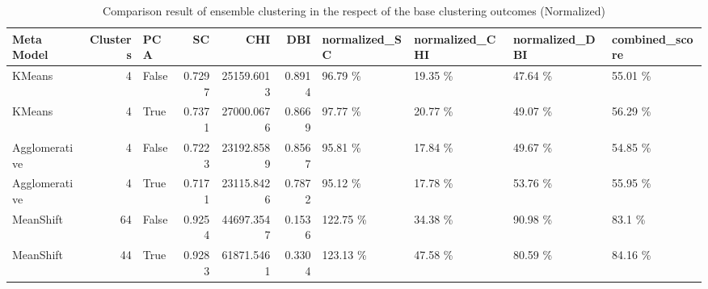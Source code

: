 \begin{table}[t]
\centering
\caption{Comparison result of ensemble clustering in the respect of the base clustering outcomes (Normalized)}
\label{tbl:meta_clustering_score_results_normalized}
\begin{tabular}{lrlrrrllll}
\toprule
   Meta Model &  Clusters &   PCA &     SC &        CHI &    DBI & normalized_SC & normalized_CHI & normalized_DBI & combined_score \\
\midrule
       KMeans &         4 & False & 0.7297 & 25159.6013 & 0.8914 &      96.79 \% &       19.35 \% &       47.64 \% &       55.01 \% \\
       KMeans &         4 &  True & 0.7371 & 27000.0676 & 0.8669 &      97.77 \% &       20.77 \% &       49.07 \% &       56.29 \% \\
Agglomerative &         4 & False & 0.7223 & 23192.8589 & 0.8567 &      95.81 \% &       17.84 \% &       49.67 \% &       54.85 \% \\
Agglomerative &         4 &  True & 0.7171 & 23115.8426 & 0.7872 &      95.12 \% &       17.78 \% &       53.76 \% &       55.95 \% \\
    MeanShift &        64 & False & 0.9254 & 44697.3547 & 0.1536 &     122.75 \% &       34.38 \% &       90.98 \% &        83.1 \% \\
    MeanShift &        44 &  True & 0.9283 & 61871.5461 & 0.3304 &     123.13 \% &       47.58 \% &       80.59 \% &       84.16 \% \\
\bottomrule
\end{tabular}
\end{table}
